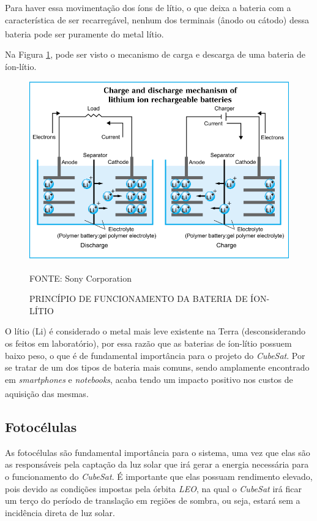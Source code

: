 \documentclass[
	12pt,				%
	openright,			%
	oneside,			%
	a4paper,			%
	english,			%
	french,				%
	spanish,			%
	brazil,				%
	oldfontcommands
	]{abntex2}
\begin{document}
	Para haver essa movimentação dos íons de lítio, o que deixa a bateria com a característica de ser recarregável, nenhum dos terminais (ânodo ou cátodo) dessa bateria pode ser puramente do metal lítio.\textsuperscript{\cite{sony}}
	
	Na Figura \ref{Fig_PF_Bat}, pode ser visto o mecanismo de carga e descarga de uma bateria de íon-lítio.
	
	\begin{figure}[th]
		\caption{PRINCÍPIO DE FUNCIONAMENTO DA BATERIA DE ÍON-LÍTIO}
		\label{Fig_PF_Bat}
		\centering
		\includegraphics[width=0.8\linewidth]{./figs/funcionamento_bateria}
			
		\begin{small}
			FONTE: Sony Corporation\textsuperscript{\cite{sony}}
		\end{small}		
	\end{figure}
	\pagebreak
	O lítio (Li) é considerado o metal mais leve existente na Terra (desconsiderando os feitos em laboratório), por essa razão que as baterias de íon-lítio possuem baixo peso, o que é de fundamental importância para o projeto do \textit{CubeSat}. Por se tratar de um dos tipos de bateria mais comuns, sendo amplamente encontrado em \textit{smartphones} e \textit{notebooks}, acaba tendo um impacto positivo nos custos de aquisição das mesmas.\textsuperscript{\cite{TecMundo}}
	
\subsection[Fotocélulas]{Fotocélulas}

	As fotocélulas são fundamental importância para o sistema, uma vez que elas são as responsáveis pela captação da luz solar que irá gerar a energia necessária para o funcionamento do \textit{CubeSat}. É importante que elas possuam rendimento elevado, pois devido as condições impostas pela órbita \textit{LEO}, na qual o \textit{CubeSat} irá ficar um terço do período de translação em regiões de sombra, ou seja, estará sem a incidência direta de luz solar.
	
\end{document}
